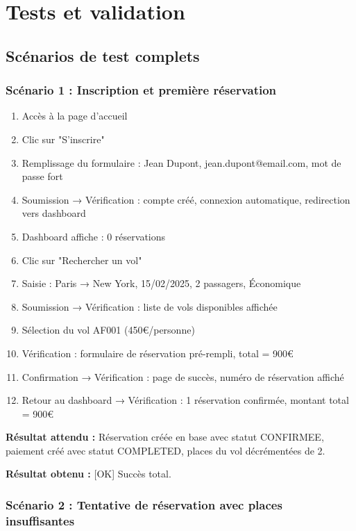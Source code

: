 \documentclass[12pt,a4paper]{report}
\begin{document}
\section{Tests et validation}

\subsection{Scénarios de test complets}

\subsubsection{Scénario 1 : Inscription et première réservation}

\begin{enumerate}
    \item Accès à la page d'accueil
    \item Clic sur "S'inscrire"
    \item Remplissage du formulaire : Jean Dupont, jean.dupont@email.com, mot de passe fort
    \item Soumission → Vérification : compte créé, connexion automatique, redirection vers dashboard
    \item Dashboard affiche : 0 réservations
    \item Clic sur "Rechercher un vol"
    \item Saisie : Paris → New York, 15/02/2025, 2 passagers, Économique
    \item Soumission → Vérification : liste de vols disponibles affichée
    \item Sélection du vol AF001 (450€/personne)
    \item Vérification : formulaire de réservation pré-rempli, total = 900€
    \item Confirmation → Vérification : page de succès, numéro de réservation affiché
    \item Retour au dashboard → Vérification : 1 réservation confirmée, montant total = 900€
\end{enumerate}

\textbf{Résultat attendu :} Réservation créée en base avec statut CONFIRMEE, paiement créé avec statut COMPLETED, places du vol décrémentées de 2.

\textbf{Résultat obtenu :} [OK] Succès total.

\subsubsection{Scénario 2 : Tentative de réservation avec places insuffisantes}
\end{document}
